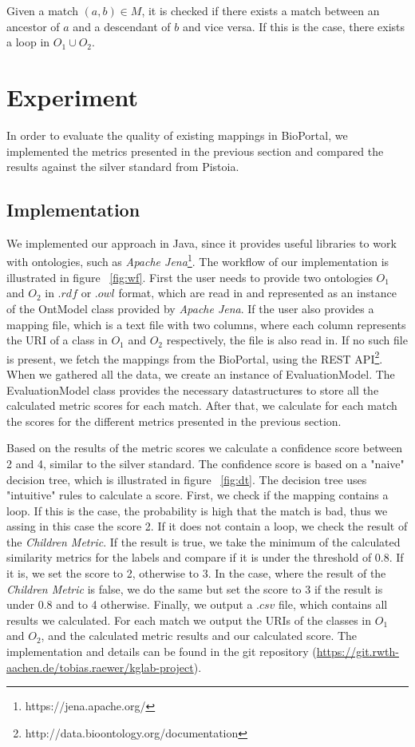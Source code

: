 \documentclass[runningheads]{llncs}
\begin{document}
 Given a match $(a,b) \in M$, it is checked if there exists a match between an ancestor of $a$ and a descendant of $b$ and vice versa. If this is the case, there exists a loop in $O_1 \cup O_2$.

\section{Experiment} \label{experiment}

In order to evaluate the quality of existing mappings in BioPortal, we implemented the metrics presented in the previous section and compared the results against the silver standard from Pistoia.

\subsection{Implementation} \label{implementation}

We implemented our approach in Java, since it provides useful libraries to work with ontologies, such as \textit{Apache Jena}\footnote{https://jena.apache.org/}. The workflow of our implementation is illustrated in figure ~\ref{fig:wf}. First the user needs to provide two ontologies $O_1$ and $O_2$ in $.rdf$ or $.owl$ format, which are read in and represented as an instance of the OntModel class provided by \textit{Apache Jena}. If the user also provides a mapping file, which is a text file with two columns, where each column represents the URI of a class in $O_1$ and $O_2$ respectively, the file is also read in. If no such file is present, we fetch the mappings from the BioPortal, using the REST API\footnote{http://data.bioontology.org/documentation}. When we gathered all the data, we create an instance of EvaluationModel. The EvaluationModel class provides the necessary datastructures to store all the calculated metric scores for each match. After that, we calculate for each match the scores for the different metrics presented in the previous section. 

Based on the results of the metric scores we calculate a confidence score between 2 and 4, similar to the silver standard. The confidence score is based on a "naive" decision tree, which is illustrated in figure ~\ref{fig:dt}. The decision tree uses "intuitive" rules to calculate a score. First, we check if the mapping contains a loop. If this is the case, the probability is high that the match is bad, thus we assing in this case the score 2. If it does not contain a loop, we check the result of the \textit{Children Metric}. If the result is true, we take the minimum of the calculated similarity metrics for the labels and compare if it is under the threshold of $0.8$. If it is, we set the score to 2, otherwise to 3. In the case, where the result of the \textit{Children Metric} is false, we do the same but set the score to 3 if the result is under $0.8$ and to 4 otherwise. Finally, we output a $.csv$ file, which contains all results we calculated. For each match we output the URIs of the classes in $O_1$ and $O_2$, and the calculated metric results and our calculated score. The implementation and details can be found in the git repository (\href{https://git.rwth-aachen.de/tobias.raewer/kglab-project}{https://git.rwth-aachen.de/tobias.raewer/kglab-project}).
\end{document}

